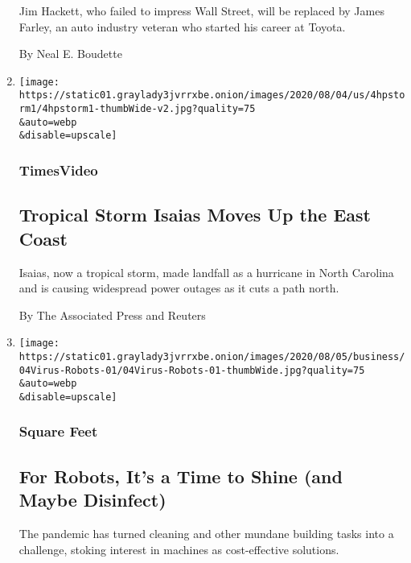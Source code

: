 \begin{enumerate}
  Jim Hackett, who failed to impress Wall Street, will be replaced by
  James Farley, an auto industry veteran who started his career at
  Toyota.

  By Neal E. Boudette
\item
  \href{/video/us/100000007271735/tropical-storm-isaias-carolinas.html}{}

  \texttt{[image: https://static01.graylady3jvrrxbe.onion/images/2020/08/04/us/4hpstorm1/4hpstorm1-thumbWide-v2.jpg?quality=75\\\&auto=webp\\\&disable=upscale]}

  \hypertarget{timesvideo-2}{%
  \subsubsection{TimesVideo}\label{timesvideo-2}}

  \hypertarget{tropical-storm-isaias-moves-up-the-east-coast}{%
  \subsection{Tropical Storm Isaias Moves Up the East
  Coast}\label{tropical-storm-isaias-moves-up-the-east-coast}}

  Isaias, now a tropical storm, made landfall as a hurricane in North
  Carolina and is causing widespread power outages as it cuts a path
  north.

  By The Associated Press and Reuters
\item
  \href{/2020/08/04/business/robot-cleaning-coronavirus.html}{}

  \texttt{[image: https://static01.graylady3jvrrxbe.onion/images/2020/08/05/business/04Virus-Robots-01/04Virus-Robots-01-thumbWide.jpg?quality=75\\\&auto=webp\\\&disable=upscale]}

  \hypertarget{square-feet}{%
  \subsubsection{Square Feet}\label{square-feet}}

  \hypertarget{for-robots-its-a-time-to-shine-and-maybe-disinfect}{%
  \subsection{For Robots, It's a Time to Shine (and Maybe
  Disinfect)}\label{for-robots-its-a-time-to-shine-and-maybe-disinfect}}

  The pandemic has turned cleaning and other mundane building tasks into
  a challenge, stoking interest in machines as cost-effective solutions.


\end{enumerate}
